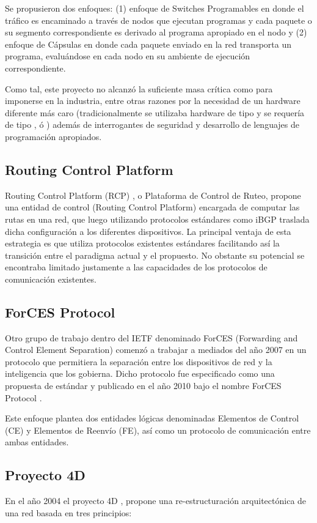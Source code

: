 Se propusieron dos enfoques: (1) enfoque de Switches Programables en donde el tr\'afico es encaminado a través de nodos que ejecutan programas y cada paquete o su segmento correspondiente es derivado al programa apropiado en el nodo y (2) enfoque de C\'apsulas en donde cada paquete enviado en la red transporta un programa, evaluándose en cada nodo en su ambiente de ejecución correspondiente.

Como tal, este proyecto no alcanz\'o la suficiente masa cr\'itica como para imponerse en la industria, entre otras razones por la necesidad de un hardware diferente m\'as caro (tradicionalmente se utilizaba hardware de tipo  y se requería de tipo ,  \'o ) adem\'as de interrogantes de seguridad y desarrollo de lenguajes de programación apropiados.

\subsection{Routing Control Platform}
Routing Control Platform (RCP) \citep{feamster2004case},\citep{caesar2005design} o Plataforma de Control de Ruteo, propone una entidad de control (Routing Control Platform) encargada de computar las rutas en una red, que luego utilizando protocolos estándares como iBGP traslada dicha configuración a los diferentes dispositivos. La principal ventaja de esta estrategia es que utiliza protocolos existentes estándares facilitando as\'i la transición entre el paradigma actual y el propuesto. No obstante su potencial se encontraba limitado justamente a las capacidades de los protocolos de comunicación existentes.

\subsection{ForCES Protocol}
Otro grupo de trabajo dentro del IETF denominado ForCES (Forwarding and Control Element Separation) comenzó a trabajar a mediados del año 2007 en un protocolo que permitiera la separación entre los dispositivos de red y la inteligencia que los gobierna. Dicho protocolo fue especificado como una propuesta de estándar y publicado en el año 2010 bajo el nombre ForCES Protocol 
 \citep{doria2010forwarding}.

Este enfoque plantea dos entidades lógicas denominadas Elementos de Control (CE) y Elementos de Reenv\'io (FE), así como un protocolo de comunicación entre ambas entidades.

\subsection{Proyecto 4D}
En el año 2004 el proyecto 4D \citep{rexford2004network},\citep{greenberg2005clean} propone una re-estructuración arquitectónica de una red basada en tres principios: 

